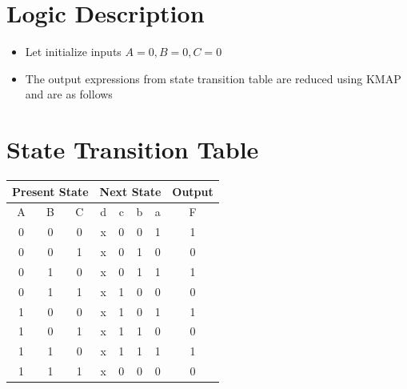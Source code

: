 \documentclass[a4paper,12pt]{article}
\begin{document}
\section*{Logic Description}
\begin{itemize}
        \item Let initialize inputs $A=0,B=0,C=0$
        \item The output expressions from state transition table are reduced using KMAP and are as follows
\end{itemize}
\section*{State Transition Table}
\begin{center}
\begin{tabular}{|c|c|c|c|c|c|c|c|}
\hline
        \multicolumn{3}{|c|}{\textbf{Present State}} & \multicolumn{4}{|c|}{\textbf{Next State}} & \textbf{Output} \\ \hline
        A & B & C & d & c & b & a & F\\ \hline
        0 & 0 & 0 & x & 0 & 0 & 1 & 1\\
        0 & 0 & 1 & x & 0 & 1 & 0 & 0\\
        0 & 1 & 0 & x & 0 & 1 & 1 & 1\\
        0 & 1 & 1 & x & 1 & 0 & 0 & 0\\
        1 & 0 & 0 & x & 1 & 0 & 1 & 1\\
        1 & 0 & 1 & x & 1 & 1 & 0 & 0\\
        1 & 1 & 0 & x & 1 & 1 & 1 & 1\\
        1 & 1 & 1 & x & 0 & 0 & 0 & 0\\ \hline
\end{tabular}
\end{center}
\end{document}

